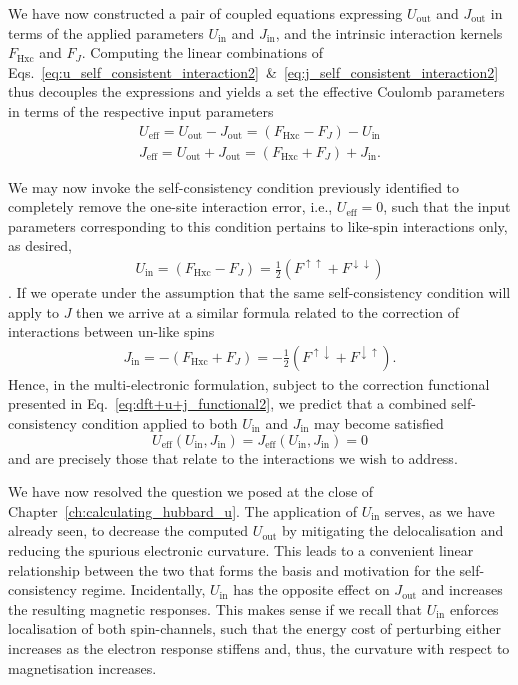 We have now constructed a pair of 
coupled equations expressing   
$U_\textrm{out}$ and $J_\textrm{out}$ 
in terms of the applied parameters 
$U_\textrm{in}$ and $J_\textrm{in}$, 
and the intrinsic interaction kernels 
$F_\textrm{Hxc}$ and $F_J$.
%
Computing the linear combinations of 
Eqs.~\eqref{eq:u_self_consistent_interaction2}~\&~\eqref{eq:j_self_consistent_interaction2} 
thus decouples the expressions and yields 
a set the effective Coulomb parameters 
in terms of the respective input parameters 
%
\begin{align}
U_\textrm{eff}=U_\textrm{out}-J_\textrm{out} = \left(F_\textrm{Hxc}-F_J\right)-U_\textrm{in}\nonumber \\
J_\textrm{eff}=U_\textrm{out}+J_\textrm{out} = \left(F_\textrm{Hxc}+F_J\right)+J_\textrm{in}.
\label{eq:uoutjout}
\end{align}

We may now invoke the 
self-consistency condition 
previously identified to completely remove  
the one-site interaction error, 
i.e., $U_\textrm{eff}=0$,   
such that the input parameters corresponding 
to this condition pertains to 
like-spin interactions only, as desired, 
%
\begin{align}
U_\textrm{in} = \left(F_\textrm{Hxc}-F_J\right)=\frac{1}{2}\left(F^{\uparrow\uparrow}+F^{\downarrow\downarrow}\right)
\label{eq:ueff}
\end{align}.
%
If we operate under the assumption that 
the same self-consistency condition will apply 
to $J$ then we arrive at a similar formula related 
to the correction of interactions between un-like spins
%
\begin{align}
J_\textrm{in} = -\left(F_\textrm{Hxc}+F_J\right)=-\frac{1}{2}\left(F^{\uparrow\downarrow}+F^{\downarrow\uparrow}\right).
\label{eq:jeff}
\end{align}
%
Hence, in the multi-electronic formulation, 
subject to the correction functional presented in 
Eq.~\eqref{eq:dft+u+j_functional2}, 
we predict that a combined self-consistency condition 
applied to both $U_\text{in}$ and $J_\text{in}$ 
may become satisfied 
%
\begin{equation}
U_\textrm{eff}(U_\textrm{in},J_\textrm{in})=J_\textrm{eff}(U_\textrm{in},J_\textrm{in})=0
\end{equation}
%
and are precisely those that relate to the interactions we wish to address.

We have now resolved the question we posed 
at the close of Chapter~\ref{ch:calculating_hubbard_u}.
%
The application of $U_\textrm{in}$ serves, 
as we have already seen, 
to decrease the computed $U_\textrm{out}$ 
by mitigating the delocalisation 
and reducing the spurious electronic curvature.
%
This leads to a convenient linear relationship between the two 
that forms the basis and motivation for the self-consistency regime.
%
Incidentally, 
$U_\textrm{in}$ has the opposite effect on $J_\textrm{out}$ 
and increases the resulting magnetic responses.
%
This makes sense if we recall that 
$U_\textrm{in}$ enforces localisation of both spin-channels, 
such that the energy cost of perturbing either increases 
as the electron response stiffens and, thus, 
the curvature with respect to magnetisation increases.

